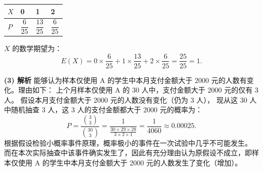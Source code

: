 \begin{answer}
\begin{center}
\begin{tabular}{llll}
\toprule
$X$ & 0 & 1 & 2 \\
\midrule
$P$ & $\dfrac{6}{25}$ & $\dfrac{13}{25}$ & $\dfrac{6}{25}$ \\
\bottomrule
\end{tabular}
\end{center}

$X$ 的数学期望为：
\nopagebreak[4]
\[E(X) = 0 \times \frac{6}{25} + 1 \times \frac{13}{25} + 2 \times \frac{6}{25} = \frac{25}{25} = 1.\]

\textbf{(3) 解析}
能够认为样本仅使用 A 的学生中本月支付金额大于 2000 元的人数有变化。理由如下：
上个月样本仅使用 A 的 30 人中，支付金额大于 2000 元的仅有 3 人。
假设本月支付金额大于 2000 元的人数没有变化（仍为 3 人），
现从这 30 人中随机抽查 3 人，这 3 人的支付金额都大于 2000 元的概率为：
\nopagebreak[4]
\[P = \frac{\binom{3}{3}}{\binom{30}{3}} = \frac{1}{\frac{30 \times 29 \times 28}{3 \times 2 \times 1}} = \frac{1}{4060} \approx 0.00025.\]
根据假设检验小概率事件原理，概率极小的事件在一次试验中几乎不可能发生。
而在本次实际抽查中该事件确实发生了，因此有充分理由认为原假设不成立，即样本仅使用 A 的学生中本月支付金额大于 2000 元的人数发生了变化（增加）。




\end{answer}
